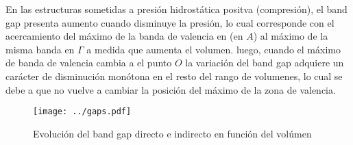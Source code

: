 En las estructuras sometidas a presión hidrostática positva (compresión), 
el band gap presenta aumento cuando disminuye la presión, lo cual corresponde
con el acercamiento del máximo de la banda de valencia en (en $A$) al máximo de la 
misma banda en $\Gamma$ a medida que aumenta el volumen. luego, cuando el
máximo de banda de valencia cambia a el punto $O$ la variación del 
band gap adquiere un carácter de disminución monótona en el resto del 
rango de volumenes, lo cual se debe a que no vuelve a cambiar la posición 
del máximo de la zona de valencia.

\begin{figure}

  \texttt{[image: ../gaps.pdf]}
  \caption{
    \protect\label{FigureBandGapvsVol}
    Evolución del band gap directo e indirecto en función del volúmen
  }

\end{figure}

